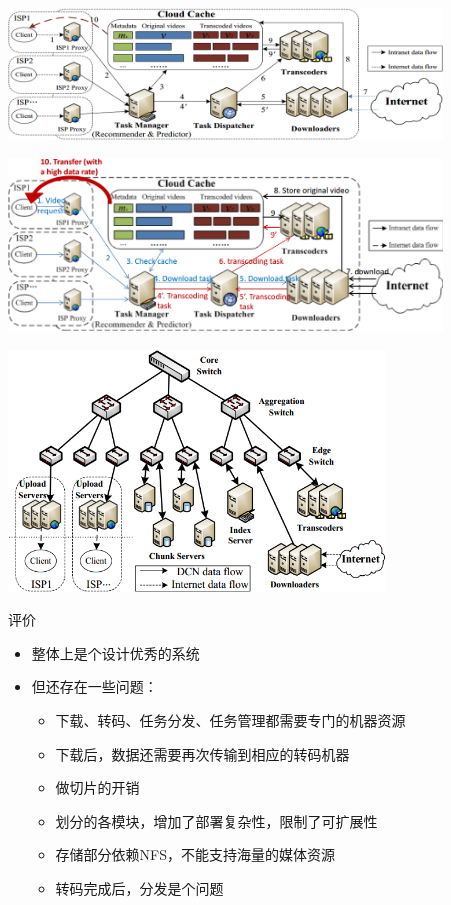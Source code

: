 \documentclass{beamer}
\begin{document}
\begin{frame}
\begin{center}
\includegraphics[width=11.5cm]{fig/cloud-transcoder_arch.png}
\end{center}
\end{frame}
\begin{frame}
\begin{center}
\includegraphics[width=11.5cm]{fig/cloud-transcoder_arch_details.png}
\end{center}
\end{frame}
\begin{frame}
\begin{center}
\includegraphics[width=10cm]{fig/cloud-cache_hardware.png}
\end{center}
\end{frame}
\begin{frame}{评价}
\begin{itemize}
	\item 整体上是个设计优秀的系统
	\item 但还存在一些问题：
	\begin{itemize}
		\item 下载、转码、任务分发、任务管理都需要专门的机器资源
		\item 下载后，数据还需要再次传输到相应的转码机器
		\item 做切片的开销
		\item 划分的各模块，增加了部署复杂性，限制了可扩展性
		\item 存储部分依赖NFS，不能支持海量的媒体资源
		\item 转码完成后，分发是个问题
	\end{itemize}
\end{itemize}
\end{frame}
\end{document}

